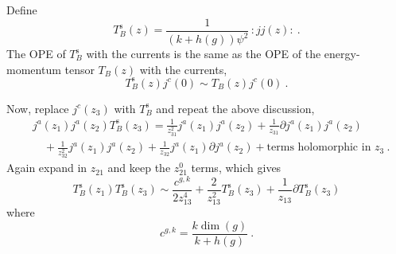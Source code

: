 \noindent Define
\begin{equation}
	T_{B}^{\mathrm{s}}(z) =\frac{1}{(k+h(g))\psi^{2}}\,:jj(z):\:. \label{11.5.21}
\end{equation}
The OPE of $T_{B}^{\mathrm{s}}$ with the currents is the same as the OPE of the energy-momentum tensor $T_{B}(z)$ with the currents,
\begin{equation}
	T_{B}^{\mathrm{s}}(z)j^{c}(0)\sim
	T_{B}(z)j^{c}(0) \:. \label{11.5.22}
\end{equation}

Now, replace $j^{c}(z_{3})$ with $T_{B}^{\mathrm{s}}$ and repeat the above discussion,
\begin{align}
	&j^{a}(z_{1})j^{a}(z_{2})T_{B}^{\mathrm{s}}(z_{3})=\frac{1}{z_{31}^{2}}j^{a}(z_{1})j^{a}(z_{2})
	+\frac{1}{z_{31}}\partial j^{a}(z_{1}) j^{a}(z_{2}) \nonumber \\
	&\quad +\frac{1}{z_{32}^{2}} j^{a}(z_{1})j^{a}(z_{2})+\frac{1}{z_{32}}j^{a}(z_{1})\partial j^{a}(z_{2})
	+\text{terms holomorphic in } z_{3} \:. \label{11.5.23}
\end{align}
Again expand in $z_{21}$ and keep the $z_{21}^{0}$ terms, which gives
\begin{equation}
	T_{B}^{\mathrm{s}}(z_{1})T_{B}^{\mathrm{s}}(z_{3}) \sim \frac{c^{g,k}}{2z_{13}^{4}}+\frac{2}{z_{13}^{2}}T_{B}^{\mathrm{s}}(z_{3})+\frac{1}{z_{13}}\partial T_{B}^{\mathrm{s}}(z_{3}) \label{11.5.24}
\end{equation}
where
\begin{equation}
	c^{g,k}=\frac{k\operatorname{dim}(g)}{k+h(g)} \:. \label{11.5.25}
\end{equation}

